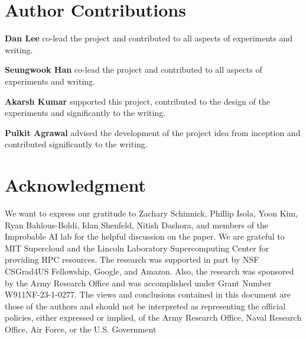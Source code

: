 \documentclass{article}
\theoremstyle{plain}
\theoremstyle{definition}
\theoremstyle{remark}
\begin{document}


\section*{Author Contributions}
\textbf{Dan Lee} co-lead the project and contributed to all aspects of experiments and writing.

\textbf{Seungwook Han} co-lead the project and contributed to all aspects of experiments and writing.

\textbf{Akarsh Kumar} supported this project, contributed to the design of the experiments and significantly to the writing.

\textbf{Pulkit Agrawal} advised the development of the project idea from inception and contributed significantly to the writing.




\section*{Acknowledgment}
We want to express our gratitude to Zachary Schinnick, Phillip Isola, Yoon Kim, Ryan Bahlous-Boldi, Idan Shenfeld, Nitish Dashora, and members of the Improbable
AI lab for the helpful discussion on the paper. We are grateful to MIT Supercloud and the Lincoln Laboratory Supercomputing Center for providing HPC resources. The
research was supported in part by NSF CSGrad4US Fellowship, Google, and Amazon. Also, the research was sponsored by the Army Research Office and was accomplished under Grant Number W911NF-23-1-0277. The views and conclusions contained
in this document are those of the authors and should not
be interpreted as representing the official policies, either
expressed or implied, of the Army Research Office, Naval
Research Office, Air Force, or the U.S. Government






\newpage
\appendix

\end{document}
